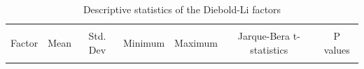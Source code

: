 \documentclass{article}
\begin{document}
\begin{table}[H]
\caption{Descriptive statistics of the Diebold-Li factors}%
\fontsize{10}{10}\selectfont
\centering %
\begin{tabular}{l c c c c c c}%
\hline\hline   \\ [-1.5ex]               %
Factor & Mean & Std. Dev & Minimum & Maximum & Jarque-Bera t-statistics  & P values \\ [0.5ex] %

\hline       \\ [-1.5ex]           %


\end{tabular}
\end{table}
\end{document}
